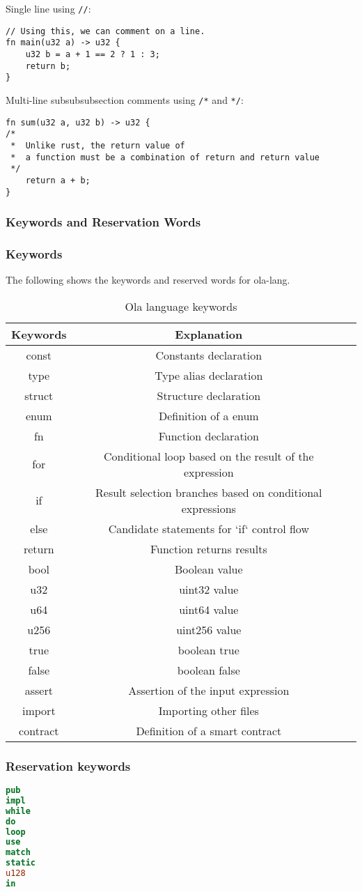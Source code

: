 Single line using \texttt{//}:
\begin{lstlisting}
// Using this, we can comment on a line.
fn main(u32 a) -> u32 {
    u32 b = a + 1 == 2 ? 1 : 3;
    return b;
}
\end{lstlisting}

Multi-line subsubsubsection comments using \texttt{/*} and \texttt{*/}:
\begin{lstlisting}
fn sum(u32 a, u32 b) -> u32 {
/* 
 *  Unlike rust, the return value of 
 *  a function must be a combination of return and return value
 */
    return a + b;
}
\end{lstlisting}



\subsubsection{Keywords and Reservation Words}

\subsubsection*{Keywords} 

The following  shows the keywords and reserved words for ola-lang.

\begin{table}[!ht]
\centering
\begin{tabular}{c|c|c}
\textbf{Keywords} & \textbf{Explanation} \\ \hline
const & Constants declaration \\
type & Type alias declaration \\
struct & Structure declaration \\
enum & Definition of a enum \\
fn & Function declaration \\
for & Conditional loop based on the result of the expression \\
if & Result selection branches based on conditional expressions \\
else & Candidate statements for `if` control flow \\
return & Function returns results \\
bool & Boolean value \\
u32 & uint32 value \\
u64 & uint64 value \\
u256 & uint256 value \\
true & boolean true \\
false & boolean false \\
assert & Assertion of the input expression \\
import & Importing other files \\
contract & Definition of a smart contract \\
\end{tabular}
\caption{Ola language keywords}
\label{table: ola-lang-keywords}
\end{table}

\subsubsection*{Reservation keywords}

\begin{lstlisting}[language=Rust]
pub
impl
while
do
loop
use
match
static
u128
in
\end{lstlisting}
    
